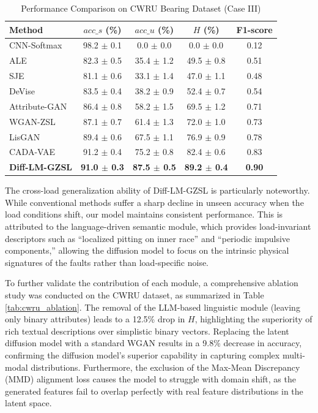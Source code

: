 \begin{table}[ht]
\centering
\caption{Performance Comparison on CWRU Bearing Dataset (Case III)}
\label{tab:cwru_results}
\begin{tabular}{lcccc}
\hline
Method & $acc\_s$ (\%) & $acc\_u$ (\%) & $H$ (\%) & F1-score \\ \hline
CNN-Softmax & 98.2 $\pm$ 0.1 & 0.0 $\pm$ 0.0 & 0.0 $\pm$ 0.0 & 0.12 \\
ALE & 82.3 $\pm$ 0.5 & 35.4 $\pm$ 1.2 & 49.5 $\pm$ 0.8 & 0.51 \\
SJE & 81.1 $\pm$ 0.6 & 33.1 $\pm$ 1.4 & 47.0 $\pm$ 1.1 & 0.48 \\
DeVise & 83.5 $\pm$ 0.4 & 38.2 $\pm$ 0.9 & 52.4 $\pm$ 0.7 & 0.54 \\
Attribute-GAN & 86.4 $\pm$ 0.8 & 58.2 $\pm$ 1.5 & 69.5 $\pm$ 1.2 & 0.71 \\
WGAN-ZSL & 87.1 $\pm$ 0.7 & 61.4 $\pm$ 1.3 & 72.0 $\pm$ 1.0 & 0.73 \\
LisGAN & 89.4 $\pm$ 0.6 & 67.5 $\pm$ 1.1 & 76.9 $\pm$ 0.9 & 0.78 \\
CADA-VAE & 91.2 $\pm$ 0.4 & 75.2 $\pm$ 0.8 & 82.4 $\pm$ 0.6 & 0.83 \\
\textbf{Diff-LM-GZSL} & \textbf{91.0 $\pm$ 0.3} & \textbf{87.5 $\pm$ 0.5} & \textbf{89.2 $\pm$ 0.4} & \textbf{0.90} \\ \hline
\end{tabular}
\end{table}

The cross-load generalization ability of Diff-LM-GZSL is particularly noteworthy. While conventional methods suffer a sharp decline in unseen accuracy when the load conditions shift, our model maintains consistent performance. This is attributed to the language-driven semantic module, which provides load-invariant descriptors such as ``localized pitting on inner race'' and ``periodic impulsive components,'' allowing the diffusion model to focus on the intrinsic physical signatures of the faults rather than load-specific noise.

To further validate the contribution of each module, a comprehensive ablation study was conducted on the CWRU dataset, as summarized in Table \ref{tab:cwru_ablation}. The removal of the LLM-based linguistic module (leaving only binary attributes) leads to a 12.5\% drop in $H$, highlighting the superiority of rich textual descriptions over simplistic binary vectors. Replacing the latent diffusion model with a standard WGAN results in a 9.8\% decrease in accuracy, confirming the diffusion model's superior capability in capturing complex multi-modal distributions. Furthermore, the exclusion of the Max-Mean Discrepancy (MMD) alignment loss causes the model to struggle with domain shift, as the generated features fail to overlap perfectly with real feature distributions in the latent space.

